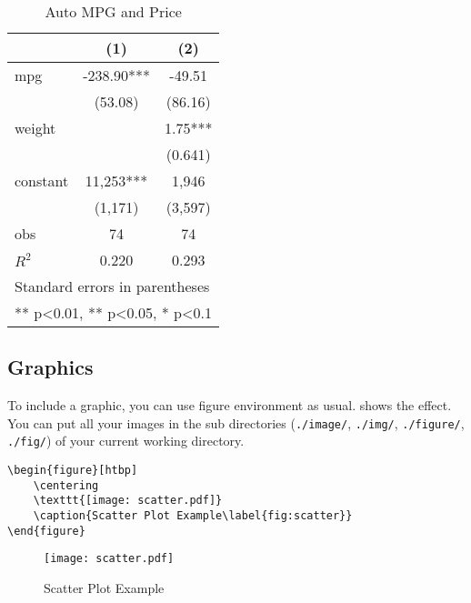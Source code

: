 \documentclass[en]{elegantpaper}
\begin{document}
\begin{table}[htbp]
  \small
  \centering
  \caption{Auto MPG and Price}
    \begin{tabular}{lcc}
    \toprule
                    &       (1)         &        (2)      \\
    \midrule
    mpg             &    -238.90***     &      -49.51     \\
                    &     (53.08)       &      (86.16)    \\
    weight          &                   &      1.75***    \\
                    &                   &      (0.641)    \\
    constant        &     11,253***     &       1,946     \\
                    &     (1,171)       &      (3,597)   \\
    obs             &        74         &         74     \\
    $R^2$           &      0.220        &       0.293    \\
    \bottomrule
    \multicolumn{3}{l}{\scriptsize Standard errors in parentheses} \\
    \multicolumn{3}{l}{\scriptsize *** p<0.01, ** p<0.05, * p<0.1} \\
    \end{tabular}%
  \label{tab:reg}%
\end{table}%



\subsection{Graphics}
To include a graphic, you can use figure environment as usual.  shows the effect. You can put all your images in the sub directories (\lstinline{./image/}, \lstinline{./img/}, \lstinline{./figure/}, \lstinline{./fig/}) of your current working directory.

\begin{lstlisting}
\begin{figure}[htbp]
	\centering
	\texttt{[image: scatter.pdf]}
	\caption{Scatter Plot Example\label{fig:scatter}}
\end{figure}
\end{lstlisting}
\begin{figure}[htbp]
	\centering
	\texttt{[image: scatter.pdf]}
	\caption{Scatter Plot Example\label{fig:scatter}}
\end{figure}
\end{document}
